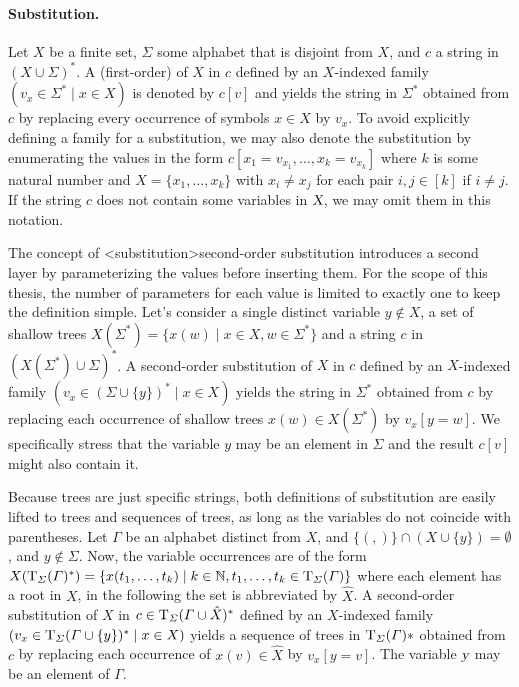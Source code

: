 \documentclass[../document.tex]{subfiles}
\begin{document}
    \paragraph{Substitution.}
    Let \(X\) be a finite set, \(\varSigma\) some alphabet that is disjoint from \(X\), and \(c\) a string in \((X \cup \varSigma)^*\).
    A (first-order)  of \(X\) in \(c\) defined by an \(X\)-indexed family \((v_x \in \varSigma^* \mid x \in X)\) is denoted by \(c[v]\) and yields the string in \(\varSigma^*\) obtained from \(c\) by replacing every occurrence of symbols \(x \in X\) by \(v_x\).
    To avoid explicitly defining a family for a substitution, we may also denote the substitution by enumerating the values in the form \(c[x_1=v_{x_1}, \ldots, x_{k}=v_{x_k}]\) where \(k\) is some natural number and \(X = \{x_1, \ldots, x_k\}\) with \(x_i \neq x_j\) for each pair \(i,j \in [k]\) if \(i\neq j\).
    If the string \(c\) does not contain some variables in \(\textsl{X}\), we may omit them in this notation.

    The concept of <substitution>{second-order substitution} introduces a second layer by parameterizing the values before inserting them.
    For the scope of this thesis, the number of parameters for each value is limited to exactly one to keep the definition simple.
    Let's consider a single distinct variable \(y \notin X\), a set of shallow trees \(X(\varSigma^*) = \{ x(w) \mid x \in X, w \in \Sigma^* \}\) and a string \(c\) in \((X(\varSigma^*) \cup \varSigma)^*\).
    A second-order substitution of \(X\) in \(c\) defined by an \(X\)-indexed family \((v_x \in (\varSigma \cup \{y\})^* \mid x \in X)\) yields the string in \(\varSigma^*\) obtained from \(c\) by replacing each occurrence of shallow trees \(x(w) \in X(\varSigma^*)\) by \(v_x[y=w]\).
    We specifically stress that the variable \(y\) may be an element in \(\varSigma\) and the result \(c[v]\) might also contain it.

    Because trees are just specific strings, both definitions of substitution are easily lifted to trees and sequences of trees, as long as the variables do not coincide with parentheses.
    Let \(\varGamma\) be an alphabet distinct from \(X\), and \(\{ (, ) \} \cap (X \cup \{y\}) = \emptyset\), and \(y \notin \varSigma\).
    Now, the variable occurrences are of the form \(X(\operatorname{T}_\varSigma(\varGamma)^*) = \{x(t_1, \ldots, t_k) \mid k \in \mathbb{N}, t_1, \ldots, t_k \in \operatorname{T}_{\varSigma}(\varGamma)\}\) where each element has a root in \(X\), in the following the set is abbreviated by \(\hat{X}\).
    A second-order substitution of \(X\) in \(c \in \operatorname{T}_\varSigma(\varGamma \cup \hat{X})^*\) defined by an \(X\)-indexed family \((v_x \in \operatorname{T}_\varSigma(\varGamma \cup \{y\})^* \mid x \in X)\) yields a sequence of trees in \(\operatorname{T}_\varSigma(\varGamma)*\) obtained from \(c\) by replacing each occurrence of \(x(v) \in \hat{X}\) by \(v_x[y=v]\).
    The variable \(\textsl{y}\) may be an element of \(\varGamma\).
\end{document}
